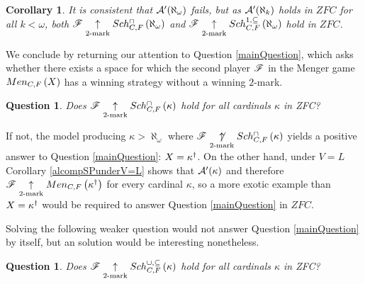 \documentclass{amsart}
\theoremstyle{plain}
\newtheorem{corollary}[theorem]{Corollary}
\newtheorem{question}[theorem]{Question}
\theoremstyle{definition}
\theoremstyle{remark}
\theoremstyle{plain}
\theoremstyle{definition}
\theoremstyle{remark}
\begin{document}

  \begin{corollary}
    It is consistent that \(\mathcal{A}'(\aleph_\omega)\) fails,
    but as \(\mathcal{A}'(\aleph_k)\) holds in \(ZFC\) for all \(k<\omega\),
    both
    \(\mathscr{F}\underset{2\text{-mark}}{\uparrow}Sch^{\cap}_{C,F}\left({\aleph_\omega}\right)\) and
    \(\mathscr{F}\underset{2\text{-mark}}{\uparrow}Sch^{1,\subseteq}_{C,F}\left({\aleph_\omega}\right)\) hold in \(ZFC\).
  \end{corollary}

  We conclude by returning our attention to Question \ref{mainQuestion},
  which asks whether there exists a space for which the second player
  \(\mathscr{F}\) in the Menger game \(Men_{C,F}\left({X}\right)\) has a winning strategy
  without a winning \(2\)-mark.

  \begin{question}
    Does
    \(\mathscr{F}\underset{2\text{-mark}}{\uparrow}Sch^{\cap}_{C,F}\left({\kappa}\right)\) hold for all cardinals
    \(\kappa\) in ZFC?
  \end{question}

  If not, the model producing \(\kappa>\aleph_\omega\) where
  \(\mathscr{F}\underset{2\text{-mark}}{\not\uparrow}Sch^{\cap}_{C,F}\left({\kappa}\right)\) yields a positive
  answer to Question \ref{mainQuestion}:
  \(X=\kappa^\dagger\). On the other hand, under \(V=L\)
  Corollary \ref{alcompSPunderV=L} shows that
  \(\mathcal{A}'(\kappa)\) and therefore
  \(\mathscr{F}\underset{2\text{-mark}}{\uparrow}Men_{C,F}\left({\kappa^\dagger}\right)\)
  for every cardinal \(\kappa\), so a more exotic example than
  \(X=\kappa^\dagger\) would be required to
  answer Question \ref{mainQuestion} in \(ZFC\).

  Solving the following weaker question would not answer Question
  \ref{mainQuestion} by itself, but an solution would be interesting nonetheless.

  \begin{question}
    Does
    \(\mathscr{F}\underset{2\text{-mark}}{\uparrow}Sch^{\cup,\subseteq}_{C,F}\left({\kappa}\right)\) hold for all cardinals
    \(\kappa\) in ZFC?
  \end{question}







\end{document}
